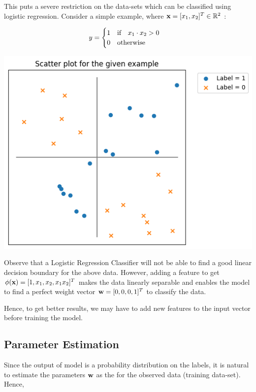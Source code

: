 This puts a severe restriction on the data-sets which can be classified using logistic regression. Consider a simple example, where $\textbf{x} = [x_1, x_2]^T \in \mathbb{R}^2$ :

\begin{equation*}
  y = \begin{cases}
    1 \qq{if} x_1 \cdot x_2 > 0 \\
    0 \qq{otherwise}
  \end{cases}
\end{equation*}

\begin{center}
  \includegraphics[scale=0.35]{images/05_03.png}
\end{center}

Observe that a Logistic Regression Classifier will not be able to find a good linear decision boundary for the above data. However, adding a feature to get $\phi(\textbf{x}) = [1, x_1, x_2, x_1 x_2]^T$ makes the data linearly separable and enables the model to find a perfect weight vector $\textbf{w} = [0, 0, 0, 1]^T$ to classify the data.

Hence, to get better results, we may have to add new features to the input vector before training the model.

\subsection{Parameter Estimation}

Since the output of model is a probability distribution on the labels, it is natural to estimate the parameters $\textbf{w}$ as the  for the observed data (training data-set). Hence,

